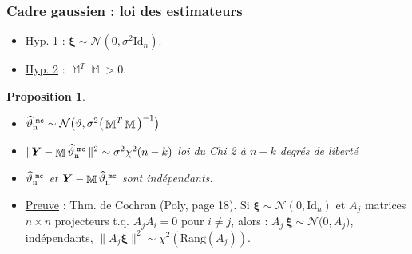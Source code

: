 \documentclass{beamer}
\newtheorem{prop}[theo]{Proposition}
\newtheorem{df}{Définition}
\DeclareMathOperator{\R}{{\mathbb R}}
\DeclareMathOperator{\bx}{\boldsymbol{x}}
\DeclareMathOperator{\estMC}{\widehat \vartheta_n^{\,\,{\tt mc}}}
\DeclareMathOperator{\design}{\mathbb{M}}
\begin{document}
%
%
%






\begin{frame}
\frametitle{Cadre gaussien : loi des estimateurs}
\begin{itemize}
\item \underline{Hyp. 1} : $\boldsymbol{\xi} \sim {\mathcal N}(0,\sigma^2\mathrm{Id}_n)$.
\item \underline{Hyp. 2} : $\design^T \design>0$.
\end{itemize}
\begin{prop}
\begin{itemize}
\item[(i)] $\estMC \sim {\mathcal N}\big(\vartheta, \sigma^2 \big(\design^T\design\big)^{-1}\big)$
\item[(ii)] $\|\boldsymbol{Y}-\design \estMC\|^2 \sim
\sigma^2\chi^2(n-k)$ \alert{ loi du Chi 2 à $n-k$ degrés de liberté}
\item[(iii)] $\estMC$ et $\boldsymbol{Y}-\design \estMC$ sont indépendants.
\end{itemize}
\end{prop}
\begin{itemize}
\item \underline{Preuve} : \alert{Thm. de Cochran} (Poly, page 18). Si
$\boldsymbol{\xi}\sim {\mathcal N}(0,\mathrm{Id}_n)$ et $A_j$
matrices $n \times n$ projecteurs t.q. $A_jA_i=0$ pour $i\neq j$,
alors : $A_j\,\boldsymbol{\xi} \sim {\mathcal N}\big(0,A_j\big)$,
\alert{indépendants}, $\|A_j\boldsymbol{\xi}\|^2\sim
\chi^2(\mathrm{Rang}(A_j))$.
\end{itemize}
\end{frame}
\end{document}
